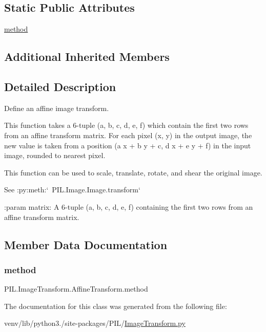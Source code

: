 \subsection*{Static Public Attributes}
\begin{DoxyCompactItemize}
\item 
\hyperlink{classPIL_1_1ImageTransform_1_1AffineTransform_a5fe1c1194599540119e753debbd0c631}{method}
\end{DoxyCompactItemize}
\subsection*{Additional Inherited Members}


\subsection{Detailed Description}
\begin{DoxyVerb}Define an affine image transform.

This function takes a 6-tuple (a, b, c, d, e, f) which contain the first
two rows from an affine transform matrix. For each pixel (x, y) in the
output image, the new value is taken from a position (a x + b y + c,
d x + e y + f) in the input image, rounded to nearest pixel.

This function can be used to scale, translate, rotate, and shear the
original image.

See :py:meth:`~PIL.Image.Image.transform`

:param matrix: A 6-tuple (a, b, c, d, e, f) containing the first two rows
    from an affine transform matrix.
\end{DoxyVerb}
 

\subsection{Member Data Documentation}
\mbox{\label{classPIL_1_1ImageTransform_1_1AffineTransform_a5fe1c1194599540119e753debbd0c631}} 
\subsubsection{\texorpdfstring{method}{method}}
{\footnotesize\ttfamily P\+I\+L.\+Image\+Transform.\+Affine\+Transform.\+method\hspace{0.3cm}{\ttfamily [static]}}



The documentation for this class was generated from the following file\+:\begin{DoxyCompactItemize}
\item 
venv/lib/python3./site-\/packages/\+P\+I\+L/\hyperlink{ImageTransform_8py}{Image\+Transform.\+py}\end{DoxyCompactItemize}
